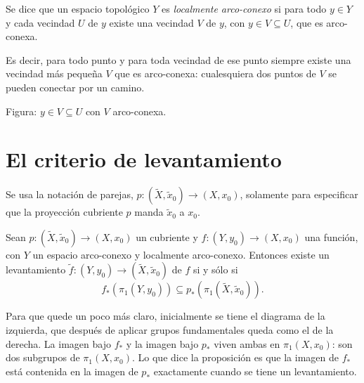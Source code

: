 \documentclass[11pt]{article}
\begin{document}
\begin{defn}\label{def:loc-arco-conexo}
Se dice que un espacio topológico $Y$ es \emph{localmente arco-conexo} si para todo $y\in Y$ y cada vecindad $U$ de $y$ existe una vecindad $V$ de $y$, con $y\in V\subseteq U$, que es arco-conexa.
\end{defn}

Es decir, para todo punto y para toda vecindad de ese punto siempre existe una vecindad más pequeña $V$ que es arco-conexa: cualesquiera dos puntos de $V$ se pueden conectar por un camino.

\begin{center}
\end{center}

\noindent Figura: $y\in V\subseteq U$ con $V$ arco-conexa.

\section*{El criterio de levantamiento}

Se usa la notación de parejas, $p\colon(\tilde X,\tilde x_0)\to(X,x_0)$, solamente para especificar que la proyección cubriente $p$ manda $\tilde x_0$ a $x_0$.

\begin{prop}\label{prop:criterio}
Sean $p\colon(\tilde X,\tilde x_0)\to(X,x_0)$ un cubriente y $f\colon(Y,y_0)\to(X,x_0)$ una función, con $Y$ un espacio arco-conexo y localmente arco-conexo. Entonces existe un levantamiento $\tilde f\colon(Y,y_0)\to(\tilde X,\tilde x_0)$ de $f$ si y sólo si
\[
  f_*(\pi_1(Y,y_0))\subseteq p_*(\pi_1(\tilde X,\tilde x_0)).
\]
\end{prop}

Para que quede un poco más claro, inicialmente se tiene el diagrama de la izquierda, que después de aplicar grupos fundamentales queda como el de la derecha. La imagen bajo $f_*$ y la imagen bajo $p_*$ viven ambas en $\pi_1(X,x_0)$: son dos subgrupos de $\pi_1(X,x_0)$. Lo que dice la proposición es que la imagen de $f_*$ está contenida en la imagen de $p_*$ exactamente cuando se tiene un levantamiento.
\end{document}
